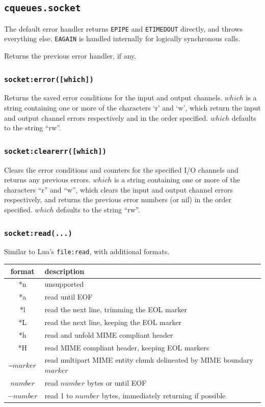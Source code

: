 \documentclass[11pt, oneside]{memoir}
\newcommand*{\fn}[1]{\texttt{#1}\xspace}
\newcommand*{\errno}[1]{\texttt{#1}\xspace}
\newcounter{toccols}
\newenvironment{Module}[1]{
	\subsection{\texttt{#1}}
	\addtocontents{toc}{
		\protect\begin{multicols}{\value{toccols}}
	}
}{
	\addtocontents{toc}{\protect\end{multicols}}
}
\begin{document}
\begin{Module}{cqueues.socket}
The default error handler returns \errno{EPIPE} and \errno{ETIMEDOUT} directly, and throws everything else. \errno{EAGAIN} is handled internally for logically synchronous calls.

Returns the previous error handler, if any.

\subsubsection[\fn{socket:error}]{\fn{socket:error([which])}}

Returns the saved error conditions for the input and output channels. $which$ is a string containing one or more of the characters `r' and `w', which return the input and output channel errors respectively and in the order specified. $which$ defaults to the string ``rw''.

\subsubsection[\fn{socket:clearerr}]{\fn{socket:clearerr([which])}}

Clears the error conditions and counters for the specified I/O channels and returns any previous errors. $which$ is a string containing one or more of the characters ``r'' and ``w'', which clears the input and output channel errors respectively, and returns the previous error numbers (or nil) in the order specified. $which$ defaults to the string ``rw''.

\subsubsection[\fn{socket:read}]{\fn{socket:read(...)}}
Similar to Lua's \fn{file:read}, with additional formats.

\begin{tabular}{c | l}
format & description\\\hline
{*n} & unsupported \\
{*a} & read until EOF \\
{*l} & read the next line, trimming the EOL marker \\
{*L} & read the next line, keeping the EOL marker \\
{*h} & read and unfold MIME compliant header \\
{*H} & read MIME compliant header, keeping EOL markers \\
{\texttt{--}$marker$} & read multipart MIME entity chunk delineated by MIME boundary $marker$ \\
$number$ & read $number$ bytes or until EOF \\
$-number$ & read 1 to $number$ bytes, immediately returning if possible \\
\end{tabular}


\end{Module}
\end{document}

